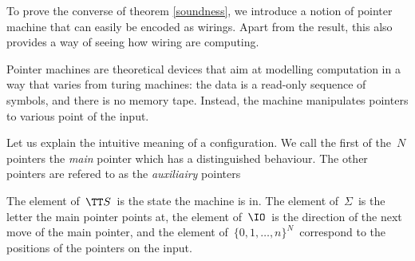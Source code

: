 To prove the converse of theorem \ref{soundness}, we introduce a notion of pointer machine that can easily be encoded as wirings.
Apart from the result, this also provides a way of seeing how wiring are computing.

Pointer machines \cite{ben-amram_what_1995} are theoretical devices that aim at modelling computation in a way that varies from turing machines: the data is a read-only sequence of symbols, and there is no memory tape. Instead, the machine manipulates pointers to various point of the input.



Let us explain the intuitive meaning of a configuration. We call the first of the $\,N\,$ pointers the \emph{main} pointer which has a distinguished behaviour.
The other pointers are refered to as the \emph{auxiliairy} pointers

The element of $\,\TT S\,$ is the state the machine is in.
The element of $\,\Sigma\,$ is the letter the main pointer points at, the element of $\,\IO\,$ is the direction of the next move of the main pointer, and the element of $\,\{0,1,\dots,n\}^N\,$ correspond to the positions of the pointers on the input.

